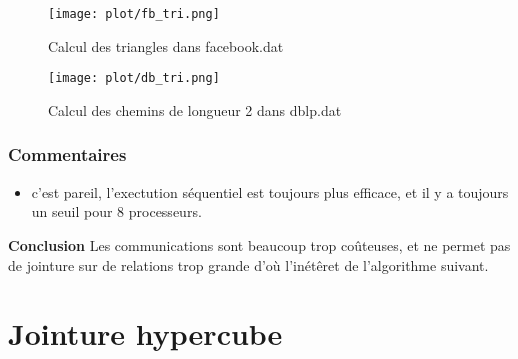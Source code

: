 \documentclass[12pt]{article}
\begin{document}
\begin{multicols}{2}
\begin{figure}[H]
  \centering
  \texttt{[image: plot/fb\_tri.png]}
  \caption{\label{fig:fb_simple} Calcul des triangles dans facebook.dat }
\end{figure}

\begin{figure}[H]
  \centering
  \texttt{[image: plot/db\_tri.png]}
  \caption{\label{fig:fb_simple} Calcul des chemins de longueur 2 \hspace*{4cm} dans dblp.dat }
\end{figure}

\end{multicols}

\subsubsection*{Commentaires}
\begin{itemize}
\item c'est pareil, l'exectution séquentiel est toujours plus efficace, et il y a toujours un seuil pour 8 processeurs. 
\end{itemize}


\vspace*{2cm}
\large{\textbf{Conclusion}}
Les communications sont beaucoup trop coûteuses, et ne permet pas de jointure sur de relations trop grande d'où l'inétêret de l'algorithme suivant. 

\section{Jointure hypercube}
\label{sec:hypercube}
\end{document}
